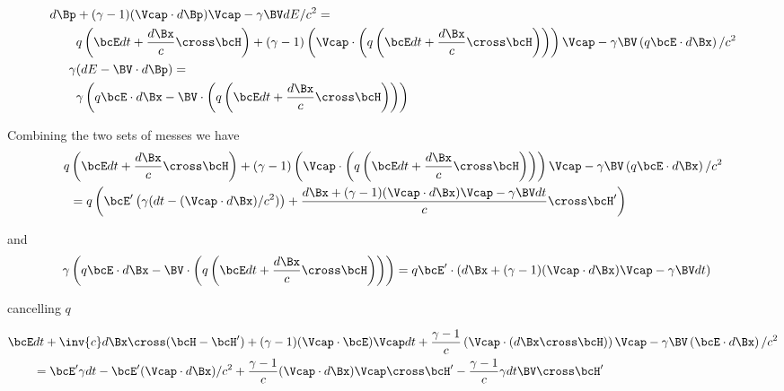\begin{equation}\label{eqn:lorentz_force_tx_2:60}
\begin{aligned}
d\Bp &+ (\gamma-1)(\Vcap \cdot d\Bp) \Vcap - \gamma \BV dE/c^2 = \\
&q \left( \bcE dt + \frac{d\Bx}{c} \cross \bcH \right) + (\gamma-1)\left(\Vcap \cdot \left(q \left( \bcE dt + \frac{d\Bx}{c} \cross \bcH \right)\right)\right) \Vcap - \gamma \BV \left( q \bcE \cdot d\Bx \right)/c^2  \\
\gamma &( dE - \BV \cdot d\Bp ) = \\
&\gamma \left( q \bcE \cdot d\Bx - \BV \cdot \left(q \left( \bcE dt + \frac{d\Bx}{c} \cross \bcH \right)\right) \right) 
\end{aligned}
\end{equation}

Combining the two sets of messes we have
\begin{equation}\label{eqn:lorentz_force_tx_2:80}
\begin{aligned}
q &\left( \bcE dt + \frac{d\Bx}{c} \cross \bcH \right) + (\gamma-1)\left(\Vcap \cdot \left(q \left( \bcE dt + \frac{d\Bx}{c} \cross \bcH \right)\right)\right) \Vcap - \gamma \BV \left( q \bcE \cdot d\Bx \right)/c^2  \\
&=q \left( \bcE' \left(\gamma ( dt - (\Vcap \cdot d\Bx )/c^2 )\right) + \frac{d\Bx + (\gamma-1)(\Vcap \cdot d\Bx) \Vcap - \gamma \BV dt}{c} \cross \bcH' \right)  \\
\end{aligned}
\end{equation}

and
\begin{equation}\label{eqn:lorentz_force_tx_2:100}
\begin{aligned}
\gamma &\left( q \bcE \cdot d\Bx - \BV \cdot \left(q \left( \bcE dt + \frac{d\Bx}{c} \cross \bcH \right)\right) \right) 
=
q \bcE' \cdot \left(d\Bx + (\gamma-1)(\Vcap \cdot d\Bx) \Vcap - \gamma \BV dt\right)
\end{aligned}
\end{equation}

cancelling \(q\)

\begin{equation}\label{eqn:lorentz_force_tx_2:120}
\begin{aligned}
\bcE &dt 
+ \inv{c} d\Bx \cross (\bcH - \bcH')
+ (\gamma-1)(\Vcap \cdot \bcE) \Vcap dt 
+ \frac{\gamma-1}{c}\left(\Vcap \cdot \left( d\Bx \cross \bcH \right)\right) \Vcap 
- \gamma \BV \left( \bcE \cdot d\Bx \right)/c^2  \\
&=
\bcE' \gamma dt 
-\bcE' (\Vcap \cdot d\Bx )/c^2 
+ \frac{\gamma-1}{c} (\Vcap \cdot d\Bx) \Vcap \cross \bcH' 
- \frac{\gamma-1}{c}\gamma dt \BV \cross \bcH' 
\end{aligned}
\end{equation}

